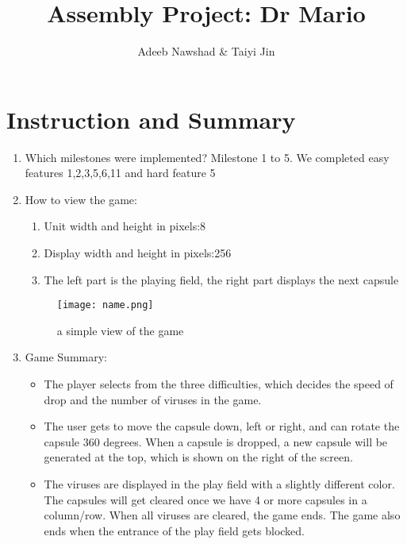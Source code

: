 \documentclass{article}
\title{Assembly Project: Dr Mario}
\author{Adeeb Nawshad & Taiyi Jin}
\begin{document}
\maketitle

\section{Instruction and Summary}

\begin{enumerate}

    \item Which milestones were implemented? 
    Milestone 1 to 5.
    We completed easy features 1,2,3,5,6,11 and hard feature 5

    \item How to view the game:
    
    
    \begin{enumerate}

    \item
    Unit width and height in pixels:8
    \item
    Display width and height in pixels:256
    \item
    The left part is the playing field, the right part displays the next capsule


    \end{enumerate}

    

\begin{figure}[ht!]
    \centering
    \texttt{[image: name.png]}
    \caption{a simple view of the game}
    \label{Instructions}
\end{figure}

\item Game Summary:
\begin{itemize}
\item
The player selects from the three difficulties, which decides the speed of drop and the number of viruses in the game.
\item
The user gets to move the capsule down, left or right, and can rotate the capsule 360 degrees. When a capsule is dropped, a new capsule will be generated at the top, which is shown on the right of the screen.
\item 
The viruses are displayed in the play field with a slightly different color. The capsules will get cleared once we have 4 or more capsules in a column/row. When all viruses are cleared, the game ends. The game also ends when the entrance of the play field gets blocked.
\end{itemize}

    
\end{enumerate}
\end{document}
